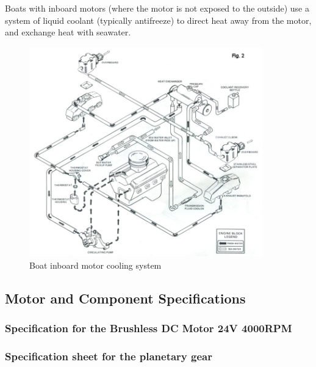 Boats with inboard motors (where the motor is not exposed to the outside) use a system of liquid coolant (typically antifreeze) to direct heat away from the motor, and exchange heat with seawater.

\begin{figure}[H]
    \centering
    \includegraphics[width=0.9\textwidth]{Sections/LiteratureReview/img/cooling/std_motor_cooling_boat.jpg}
    \caption{Boat inboard motor cooling system \cite{noauthor_inboard_nodate}}
    \label{fig:cooling_motor_boat_inboard}
\end{figure}




\subsection{Motor and Component Specifications} \label{app:motor_comp_spec}

\subsubsection{Specification for the Brushless DC Motor 24V 4000RPM \cite{robots_shop_24v_nodate}}


\subsubsection{Specification sheet for the planetary gear \cite{banggood_nema_nodate}}

